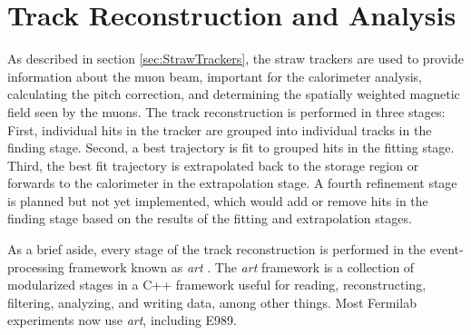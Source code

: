 
\thispagestyle{myheadings}

\graphicspath{{Body/Figures/TrackingFigures/}{Body/Figures/TrackingFigures/OriginalDocumentationPlots/}{Body/Figures/TrackingFigures/OriginalDocumentationPlots/PlanePlots/}{Body/Figures/TrackingFigures/OriginalDocumentationPlots/PullPlots/}{Body/Figures/TrackingFigures/OriginalDocumentationPlots/Residuals/}{Body/Figures/TrackingFigures/eLossAndMaterial/}{Body/Figures/TrackingFigures/CoordSys/}{Body/Figures/TrackingFigures/TrackerPics/}{Body/Figures/TrackingFigures/Field/}{Body/Figures/TrackingFigures/TrackingFlow/}{Body/Figures/TrackingFigures/LeftRight/}{Body/Figures/TrackingFigures/Misc/}{Body/Figures/TrackingFigures/Extrapolation/}{Body/Figures/TrackingFigures/Tracks/}{Body/Figures/TrackingFigures/BeamMeasurements/}{Body/Figures/TrackingFigures/MCDataComparison/}{Body/Figures/TrackingFigures/VacuumPlots/}{Body/Figures/TrackingFigures/UpdatedDocumentationPlots/Images/}{Body/Figures/TrackingFigures/VacuumPlots/}{Body/Figures/TrackingFigures/Feb19DataPlots/Images/}}

\chapter{Track Reconstruction and Analysis}
\label{chapter:TrackReconstruction}

As described in section \ref{sec:StrawTrackers}, the straw trackers are used to provide information about the muon beam, important for the calorimeter \wa analysis, calculating the \wa pitch correction, and determining the spatially weighted magnetic field seen by the muons. The track reconstruction is performed in three stages: First, individual hits in the tracker are grouped into individual tracks in the finding stage. Second, a best trajectory is fit to grouped hits in the fitting stage. Third, the best fit trajectory is extrapolated back to the storage region or forwards to the calorimeter in the extrapolation stage. A fourth refinement stage is planned but not yet implemented, which would add or remove hits in the finding stage based on the results of the fitting and extrapolation stages.

As a brief aside, every stage of the track reconstruction is performed in the event-processing framework known as \textit{art} \cite{art}. The \textit{art} framework is a collection of modularized stages in a C++ framework useful for reading, reconstructing, filtering, analyzing, and writing data, among other things. Most Fermilab experiments now use \textit{art}, including E989.


